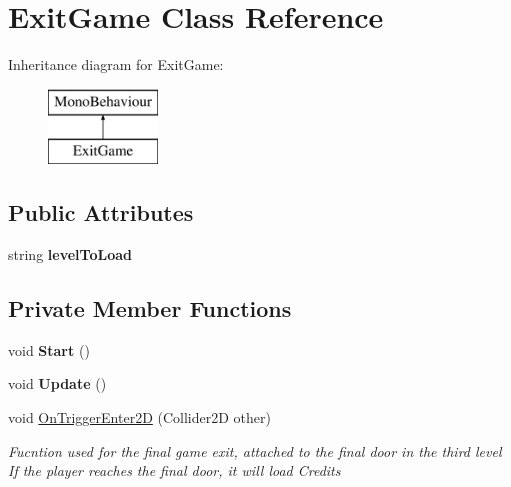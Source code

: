\hypertarget{class_exit_game}{}\section{Exit\+Game Class Reference}
\label{class_exit_game}
Inheritance diagram for Exit\+Game\+:\begin{figure}[H]
\begin{center}
\leavevmode
\includegraphics[height=2.000000cm]{class_exit_game}
\end{center}
\end{figure}
\subsection*{Public Attributes}
\begin{DoxyCompactItemize}
\item 
\mbox{\label{class_exit_game_ad6440f83b717879b937952479cb993db}} 
string {\bfseries level\+To\+Load}
\end{DoxyCompactItemize}
\subsection*{Private Member Functions}
\begin{DoxyCompactItemize}
\item 
\mbox{\label{class_exit_game_a974a7e22cd4534905c5f3a5bc71b1911}} 
void {\bfseries Start} ()
\item 
\mbox{\label{class_exit_game_aa885bfa25f536f607fea2cb2f5ae487c}} 
void {\bfseries Update} ()
\item 
void \mbox{\hyperlink{class_exit_game_a8f08c761927046e6e12aad0e76907609}{On\+Trigger\+Enter2D}} (Collider2D other)
\begin{DoxyCompactList}\small\item\em Fucntion used for the final game exit, attached to the final door in the third level If the player reaches the final door, it will load Credits \end{DoxyCompactList}\end{DoxyCompactItemize}


